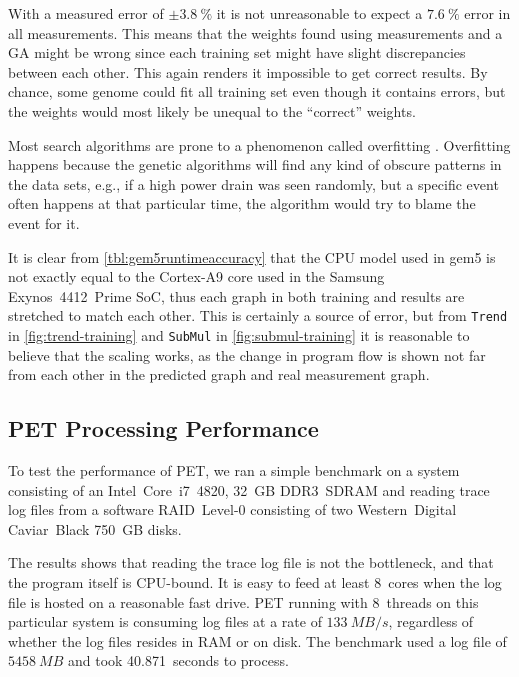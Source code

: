 With a measured error of $\pm3.8~\%$ it is not unreasonable to expect a $7.6~\%$
error in all measurements. This means that the weights found using measurements
and a GA might be wrong since each training set might have slight discrepancies
between each other. This again renders it impossible to get correct results. By
chance, some genome could fit all training set even though it contains errors,
but the weights would most likely be unequal to the ``correct'' weights.

Most search algorithms are prone to a phenomenon called overfitting
\cite{russellnorvig}. Overfitting happens because the genetic algorithms will
find any kind of obscure patterns in the data sets, e.g., if a high power drain
was seen randomly, but a specific event often happens at that particular time,
the algorithm would try to blame the event for it.

It is clear from \autoref{tbl:gem5runtimeaccuracy} that the CPU model used in
gem5 is not exactly equal to the Cortex-A9 core used in the Samsung
Exynos~4412~Prime SoC, thus each graph in both training and results are
stretched to match each other. This is certainly a source of error, but from
\texttt{Trend} in \autoref{fig:trend-training} and \texttt{SubMul} in
\autoref{fig:submul-training} it is reasonable to believe that the scaling
works, as the change in program flow is shown not far from each other in the
predicted graph and real measurement graph.


\subsection{PET Processing Performance}

To test the performance of PET, we ran a simple benchmark on a system consisting of an
Intel~Core~i7~4820, 32~GB DDR3~SDRAM and reading trace log files from a software
RAID~Level-0 consisting of two Western~Digital Caviar~Black 750~GB disks.

The results shows that reading the trace log file is not the bottleneck, and
that the program itself is CPU-bound. It is easy to feed at least 8~cores when
the log file is hosted on a reasonable fast drive. PET running with 8~threads on
this particular system is consuming log files at a rate of $133~MB/s$,
regardless of whether the log files resides in RAM or on disk. The benchmark used
a log file of $5458~MB$ and took 40.871~seconds to process.

